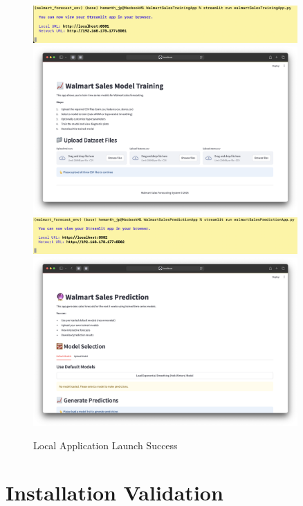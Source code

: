 \begin{figure}[H]
    \centering
   \includegraphics[width=0.9\textwidth]{Images/02InstallationAndSetup/LocalLaunchTerminalTrain.png}
   \includegraphics[width=0.9\textwidth]{Images/02InstallationAndSetup/LocalLaunchAppTrain.png}
   \includegraphics[width=0.9\textwidth]{Images/02InstallationAndSetup/LocalLaunchTerminalPredict.png}   
   \includegraphics[width=0.9\textwidth]{Images/02InstallationAndSetup/LocalLaunchAppPredict.png}
          \caption{Local Application Launch Success}
    \label{fig:local_launch}
\end{figure}

\section{Installation Validation}


